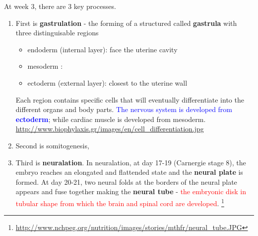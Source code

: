 At week 3, there are 3 key processes. 
\begin{enumerate}
  \item  First is {\bf gastrulation} - the forming
of a structured called {\bf gastrula} with three distinguisable regions   
\begin{itemize}
  \item endoderm (internal layer): face the uterine cavity
  \item mesoderm : 
  \item ectoderm (external layer): closest to the uterine wall
\end{itemize}
Each region contains specific cells that will eventually differentiate into the
different organs and body parts. \textcolor{blue}{The nervous system is
developed from {\bf ectoderm}}; while cardiac muscle is developed from mesoderm.
\url{http://www.biophylaxis.gr/images/en/cell_differentiation.jpg}

  \item 
  Second is somitogenesis, 
  
  \item 
  Third is {\bf neuralation}. In neuralation,
  at day 17-19 (Carnergie stage 8), the embryo reaches an elongated and flattended state
and the {\bf neural plate} is formed. At day 20-21, two neural folds at the
borders of the neural plate appears and fuse together making the {\bf neural
tube} -
\textcolor{red}{the embryonic disk in tubular shape from which the brain and
spinal cord are developed}.
\footnote{\url{http://www.nchpeg.org/nutrition/images/stories/mthfr/neural_tube.JPG}}

\end{enumerate}


